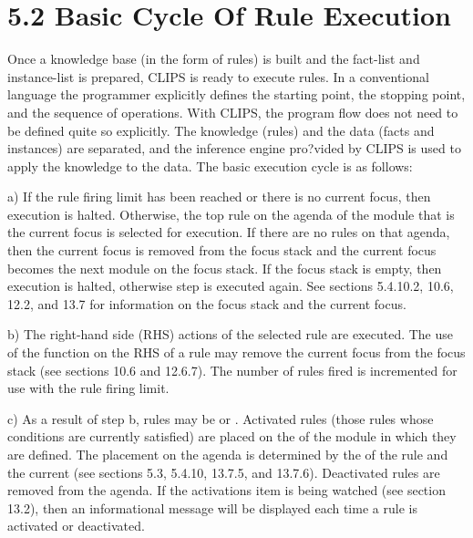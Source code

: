 \documentclass[letterpaper,10pt,english]{sphinxmanual}
\begin{document}

\begin{sphinxVerbatim}[commandchars=\\\{\}]
  
    
    
     
\end{sphinxVerbatim}


\section{5.2 Basic Cycle Of Rule Execution}
\label{\detokenize{defrule:basic-cycle-of-rule-execution}}
Once a knowledge base (in the form of rules) is built and the fact-list
and instance-list is prepared, CLIPS is ready to execute rules. In a
conventional language the programmer explicitly defines the starting
point, the stopping point, and the sequence of operations. With CLIPS,
the program flow does not need to be defined quite so explicitly. The
knowledge (rules) and the data (facts and instances) are separated, and
the inference engine pro?vided by CLIPS is used to apply the knowledge
to the data. The basic execution cycle is as follows:

a) If the rule firing limit has been reached or there is no current
focus, then execution is halted. Otherwise, the top rule on the agenda
of the module that is the current focus is selected for execution. If
there are no rules on that agenda, then the current focus is removed
from the focus stack and the current focus becomes the next module on
the focus stack. If the focus stack is empty, then execution is halted,
otherwise step  is executed again. See sections 5.4.10.2, 10.6, 12.2,
and 13.7 for information on the focus stack and the current focus.

b) The right-hand side (RHS) actions of the selected rule are executed.
The use of the  function on the RHS of a rule may remove the
current focus from the focus stack (see sections 10.6 and 12.6.7). The
number of rules fired is incremented for use with the rule firing limit.

c) As a result of step b, rules may be  or .
Activated rules (those rules whose conditions are currently satisfied)
are placed on the  of the module in which they are defined.
The placement on the agenda is determined by the  of the
rule and the current  (see sections 5.3,
5.4.10, 13.7.5, and 13.7.6). Deactivated rules are removed from the
agenda. If the activations item is being watched (see section 13.2),
then an informational message will be displayed each time a rule is
activated or deactivated.
\end{document}
